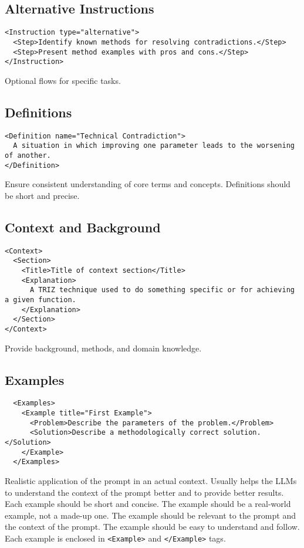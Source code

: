 \documentclass[a4paper,11pt]{refart}
\begin{document}
\subsection{Alternative Instructions}
\begin{lstlisting}
<Instruction type="alternative">
  <Step>Identify known methods for resolving contradictions.</Step>
  <Step>Present method examples with pros and cons.</Step>
</Instruction>
\end{lstlisting}
Optional flows for specific tasks.

\subsection{Definitions}
\begin{lstlisting}
<Definition name="Technical Contradiction">
  A situation in which improving one parameter leads to the worsening of another.
</Definition>
\end{lstlisting}
Ensure consistent understanding of core terms and concepts. Definitions should be short and precise.

\subsection{Context and Background}
\begin{lstlisting}
<Context>
  <Section>
    <Title>Title of context section</Title>
    <Explanation>
      A TRIZ technique used to do something specific or for achieving a given function.
    </Explanation>
  </Section>
</Context>
\end{lstlisting}
Provide background, methods, and domain knowledge.

\subsection{Examples}
\begin{lstlisting}
  <Examples>
    <Example title="First Example">
      <Problem>Describe the parameters of the problem.</Problem>
      <Solution>Describe a methodologically correct solution.</Solution>
    </Example>
  </Examples>
\end{lstlisting}
Realistic application of the prompt in an actual context. Usually helps the LLMs to understand the context of the prompt better and to provide better results. Each example should be short and concise. The example should be a real-world example, not a made-up one. The example should be relevant to the prompt and the context of the prompt. The example should be easy to understand and follow. Each example is enclosed in \lstinline!<Example>! and \lstinline!</Example>! tags.
\end{document}

